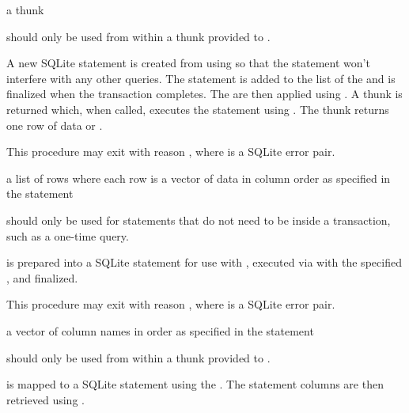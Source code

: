 \begin{procedure}
\end{procedure}
\returns{}
a thunk

 should only be used from within a thunk 
provided to .

A new SQLite statement is created from  using
 so that the statement won't interfere with
any other queries. The statement is added to the
 list of the  and is
finalized when the transaction completes.  The  are then
applied using . A thunk is returned which, when
called, executes the statement using . The thunk
returns one row of data or .

This procedure may exit with reason , where  is a SQLite error pair.

\begin{procedure}
\end{procedure}
\returns{}
a list of rows where each row is a vector of data in column order as
specified in the  statement

 should only be used for statements that do not need to be inside a transaction, such as a one-time query.

 is prepared into a SQLite statement for use with , executed via  with the specified , and finalized.

This procedure may exit with reason , where  is a SQLite error pair.

\begin{procedure}
\end{procedure}
\returns{}
a vector of column names in order as specified in the  statement

 should only be used from within a thunk 
provided to .

 is mapped to a SQLite statement using the
. The statement columns are then retrieved
using .

